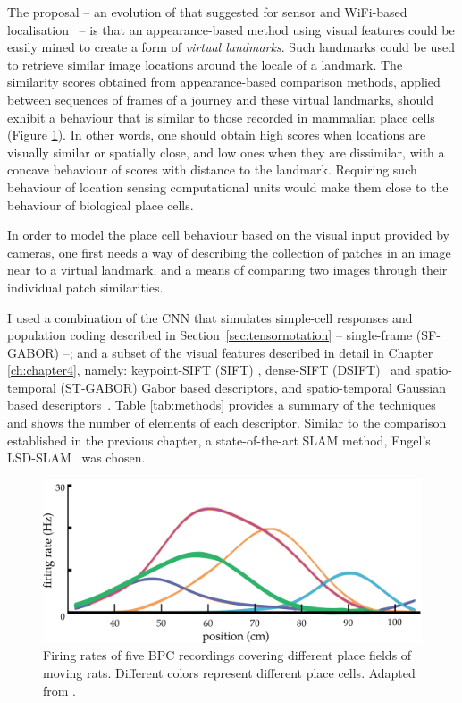 The proposal -- an evolution of that suggested for sensor and WiFi-based localisation~\cite{wang2012no} -- is that an appearance-based method using visual features could be easily mined to create a form of \textit{virtual landmarks}.  Such landmarks could be used to retrieve similar image locations around the locale of a landmark. The similarity scores obtained from appearance-based comparison methods, applied between sequences of frames of a journey and these virtual landmarks, should exhibit a behaviour that is similar to those recorded in mammalian place cells (Figure \ref{fig:BPCdragoi}). In other words, one should obtain high scores when locations are visually similar or spatially close, and low ones when they are dissimilar, with a concave behaviour of scores with distance to the landmark. Requiring such behaviour of location sensing computational units would make them close to the behaviour of biological place cells. 

In order to model the place cell behaviour based on the visual input provided by cameras, one first needs a way of describing the collection of patches in an image near to a virtual landmark, and a means of comparing two images through their individual patch similarities. 

I used a combination of the CNN that simulates simple-cell responses and population coding described in Section~\ref{sec:tensornotation} -- single-frame (SF-GABOR) --; and a subset of the visual features described in detail in Chapter \ref{ch:chapter4}, namely: keypoint-SIFT (SIFT) \cite{lowe2004distinctive}, dense-SIFT (DSIFT)~\cite{vedaldi2010vlfeat} and spatio-temporal (ST-GABOR) Gabor based descriptors, and spatio-temporal Gaussian based descriptors~\cite{RiveraWearable}. Table \ref{tab:methods} provides a summary of the techniques and shows the number of elements of each descriptor. Similar to the comparison established in the previous chapter, a state-of-the-art SLAM method, Engel's LSD-SLAM~\cite{engel2014lsd} was chosen.


\begin{figure}[]
\includegraphics[width=\linewidth]{gfx/Chapter05/dragoi_et_al_place_cell.pdf}
\caption{Firing rates of five BPC recordings covering different place fields of moving rats. Different colors represent different place cells. Adapted from \citep{dragoi2014selection}.}
\label{fig:BPCdragoi}
\end{figure}

